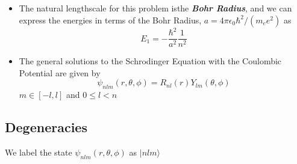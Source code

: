 \documentclass{article}
\newcommand{\ket}[1]{|#1 \rangle}
\begin{document}
\begin{itemize}
  \vskip 0.25cm
  \item The natural lengthscale for this problem isthe \emph{\textbf{Bohr Radius}}, and we can express the energies in terms of the Bohr Radius, $a = 4\pi \epsilon_0 \hbar^2 / (m_e e^2)$ as
  \[ E_1 = - \frac{\hbar^2}{a^2} \frac{1}{n^2} \]

  \vskip 0.25cm
  \item The general solutions to the Schrodinger Equation with the Coulombic Potential are given by 
  \[ \psi_{nlm}(r, \theta, \phi) = R_{nl}(r) Y_{lm}(\theta, \phi) \]
  $m \in [-l, l]$ and $0 \leq l < n$
\end{itemize}

\vskip 1cm
\subsection{Degeneracies}

We label the state $\psi_{nlm}(r, \theta, \phi)$ as $\ket{nlm}$
\end{document}
